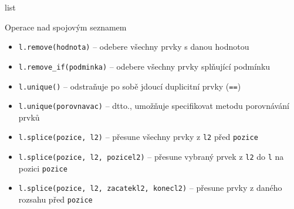 
\begin{frame}[fragile]
\begin{block}{list}
\end{block}
\end{frame}




\begin{frame}[fragile]
\begin{block}{Operace nad spojovým seznamem}
\begin{itemize}
\item \lstinline|l.remove(hodnota)| -- odebere všechny prvky s danou hodnotou
\item \lstinline|l.remove_if(podminka)| -- odebere všechny prvky splňující podmínku


\item \lstinline|l.unique()| -- odstraňuje po sobě jdoucí duplicitní prvky (\lstinline|==|)
\item \lstinline|l.unique(porovnavac)| -- dtto., umožňuje specifikovat metodu porovnávání prvků

\item \lstinline|l.splice(pozice, l2)| -- přesune všechny prvky z \lstinline|l2| před \lstinline|pozice|
\item \lstinline|l.splice(pozice, l2, pozicel2)| -- přesune vybraný prvek z \lstinline|l2| do \lstinline|l| na pozici \lstinline|pozice|
\item \lstinline|l.splice(pozice, l2, zacatekl2, konecl2)| -- přesune prvky z daného rozsahu před \lstinline|pozice|
\end{itemize}
\end{block}
\end{frame}




